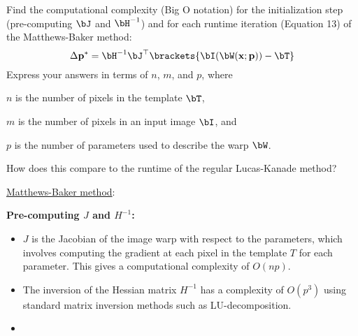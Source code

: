 \newpage
\begin{problem}
  Find the computational complexity (Big O notation) for the initialization
  step (pre-computing $\bJ$ and $\bH^{-1}$) and for each runtime iteration
  (Equation 13) of the Matthews-Baker method:
  \[
    \Delta \bp^\ast = \bH^{-1} \bJ^\top \brackets{\bI(\bW(\bx; \bp)) - \bT}
  \]
  Express your answers in terms of $n$, $m$, and $p$, where
  \begin{enumroman}
    \item $n$ is the number of pixels in the template $\bT$,
    \item $m$ is the number of pixels in an input image $\bI$, and
    \item $p$ is the number of parameters used to describe the warp $\bW$.
  \end{enumroman}
  How does this compare to the runtime of the regular Lucas-Kanade method?
  \begin{answer}
    \underline{Matthews-Baker method}:
    \begin{enumarabic}
      \item \textbf{Pre-computing $J$ and $H^{-1}$:}
        \begin{itemize}
          \item $J$ is the Jacobian of the image warp with respect to the parameters,
            which involves computing the gradient at each pixel in the template $T$ for each parameter.
            This gives a computational complexity of $O(np)$.
          \item The inversion of the Hessian matrix $H^{-1}$ has a complexity of
            $O(p^3)$ using standard matrix inversion methods such as \textsc{LU}-decomposition.
          \item {}
        \end{itemize}


\end{enumarabic}
\end{answer}
\end{problem}
